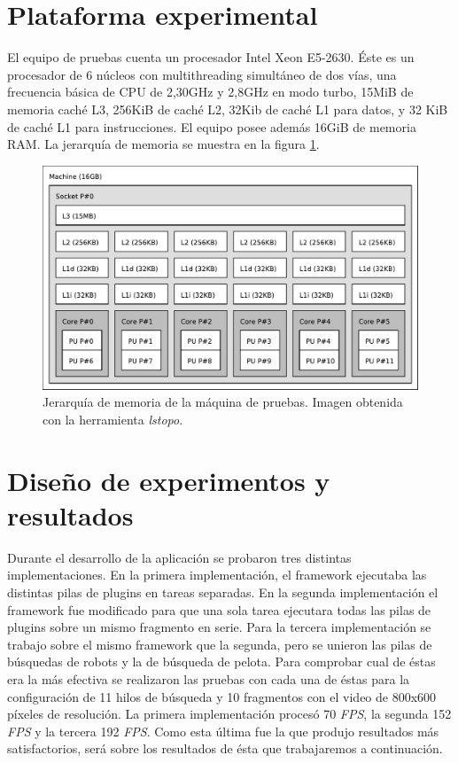 \section{Plataforma experimental}

\label{plataformaExperimental}

El equipo de pruebas cuenta un procesador Intel Xeon E5-2630. Éste es un
procesador de 6 núcleos con multithreading simultáneo de dos vías, una
frecuencia básica de CPU de 2,30GHz y 2,8GHz en modo turbo, 15MiB de memoria
caché L3, 256KiB de caché L2, 32Kib de caché L1 para datos, y 32 KiB de caché L1
para instrucciones. El equipo posee además 16GiB de memoria RAM. La jerarquía de
memoria se muestra en la figura \ref{topoMemoria}.

\begin{figure}[!htb]

	\includegraphics[width=\textwidth]{img/topo.pdf}
	\caption{Jerarquía de memoria de la máquina de pruebas. Imagen obtenida
	con la herramienta \emph{lstopo}.}

	\label{topoMemoria}

\end{figure}

\section{Diseño de experimentos y resultados}

\label{resultados}

Durante el desarrollo de la aplicación se probaron tres distintas
implementaciones. En la primera implementación, el framework ejecutaba las
distintas pilas de plugins en tareas separadas. En la segunda implementación el
framework fue modificado para que una sola tarea ejecutara todas las pilas de
plugins sobre un mismo fragmento en serie. Para la tercera implementación se
trabajo sobre el mismo framework que la segunda, pero se unieron las pilas de
búsquedas de robots y la de búsqueda de pelota. Para comprobar cual de éstas era
la más efectiva se realizaron las pruebas con cada una de éstas para la
configuración de 11 hilos de búsqueda y 10 fragmentos con el video de 800x600
píxeles de resolución. La primera implementación procesó 70 \emph{FPS}, la
segunda 152 \emph{FPS} y la tercera 192 \emph{FPS}. Como esta última fue la que
produjo resultados más satisfactorios, será sobre los resultados de ésta que
trabajaremos a continuación.


